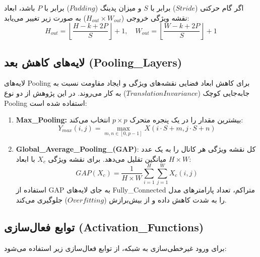 \documentclass{report}
\begin{document}
 	اگر گام حرکتی ($Stride$) برابر با $S$ و میزان پدینگ ($Padding$) برابر با $P$ باشد، ابعاد نقشه ویژگی خروجی ($H_{out} \times W_{out}$) به صورت زیر تغییر می‌یابد:
 	\begin{equation}
 		H_{out} = \left\lfloor \frac{H - k + 2P}{S} \right\rfloor + 1, \quad W_{out} = \left\lfloor \frac{W - k + 2P}{S} \right\rfloor + 1
 	\end{equation}
 	
 	\subsection{لایه‌های کاهش بعد (Pooling\_Layers)}
 	لایه‌های Pooling برای کاهش ابعاد فضایی نقشه‌های ویژگی و ایجاد مقاومت نسبت به جابه‌جایی کوچک ($Translation Invariance$) به کار می‌روند. در این پژوهش از دو نوع Pooling استفاده شده است:
 	\begin{enumerate}
 		\item \textbf{Max\_Pooling:} بیشترین مقدار را در یک پنجره متحرک $p \times p$ انتخاب می‌کند:
 		\begin{equation}
 			Y_{max}(i, j) = \max_{m, n \in [0, p-1]} X(i \cdot S + m, j \cdot S + n)
 		\end{equation}
 		\item \textbf{Global\_Average\_Pooling\_(GAP)}: کل نقشه ویژگی هر کانال را به یک عدد میانگین تقلیل می‌دهد. برای نقشه ویژگی $X_c$ با ابعاد $H \times W$:
 		\begin{equation}
 			GAP(X_c) = \frac{1}{H \times W} \sum_{i=1}^{H} \sum_{j=1}^{W} X_c(i, j)
 		\end{equation}
 		استفاده از GAP به جای لایه‌های Fully\_Connected متراکم، تعداد پارامترهای مدل را به شدت کاهش داده و از بیش‌برازش ($Overfitting$) جلوگیری می‌کند.
 	\end{enumerate}
 	
 	\subsection{توابع فعال‌سازی (Activation\_Functions)}
 	برای ورود غیرخطی‌سازی به شبکه، از توابع فعال‌سازی زیر استفاده می‌شود:
 	
\end{document}
